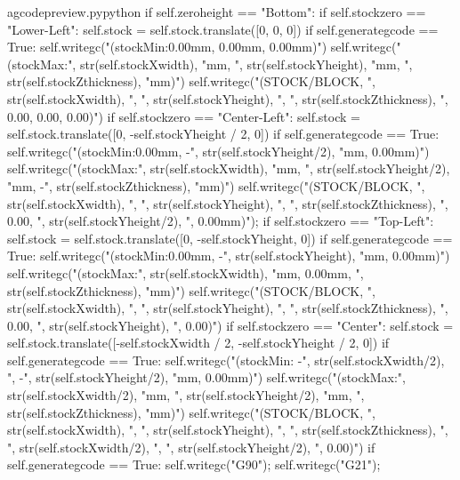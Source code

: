 \documentclass{ltxdoc}
\begin{document}
\begin{writecode}{a}{gcodepreview.py}{python}
        if self.zeroheight == "Bottom":
            if self.stockzero == "Lower-Left":
                 self.stock = self.stock.translate([0, 0, 0])
                 if self.generategcode == True:
                     self.writegc("(stockMin:0.00mm, 0.00mm, 0.00mm)")
                     self.writegc("(stockMax:", str(self.stockXwidth), "mm, ", str(self.stockYheight), "mm, ", str(self.stockZthickness), "mm)")
                     self.writegc("(STOCK/BLOCK, ", str(self.stockXwidth), ", ", str(self.stockYheight), ", ", str(self.stockZthickness), ", 0.00, 0.00, 0.00)")
            if self.stockzero == "Center-Left":
                self.stock = self.stock.translate([0, -self.stockYheight / 2, 0])
                if self.generategcode == True:
                    self.writegc("(stockMin:0.00mm, -", str(self.stockYheight/2), "mm, 0.00mm)")
                    self.writegc("(stockMax:", str(self.stockXwidth), "mm, ", str(self.stockYheight/2), "mm, -", str(self.stockZthickness), "mm)")
                    self.writegc("(STOCK/BLOCK, ", str(self.stockXwidth), ", ", str(self.stockYheight), ", ", str(self.stockZthickness), ", 0.00, ", str(self.stockYheight/2), ", 0.00mm)");
            if self.stockzero == "Top-Left":
                self.stock = self.stock.translate([0, -self.stockYheight, 0])
                if self.generategcode == True:
                    self.writegc("(stockMin:0.00mm, -", str(self.stockYheight), "mm, 0.00mm)")
                    self.writegc("(stockMax:", str(self.stockXwidth), "mm, 0.00mm, ", str(self.stockZthickness), "mm)")
                    self.writegc("(STOCK/BLOCK, ", str(self.stockXwidth), ", ", str(self.stockYheight), ", ", str(self.stockZthickness), ", 0.00, ", str(self.stockYheight), ", 0.00)")
            if self.stockzero == "Center":
                self.stock = self.stock.translate([-self.stockXwidth / 2, -self.stockYheight / 2, 0])
                if self.generategcode == True:
                    self.writegc("(stockMin: -", str(self.stockXwidth/2), ", -", str(self.stockYheight/2), "mm, 0.00mm)")
                    self.writegc("(stockMax:", str(self.stockXwidth/2), "mm, ", str(self.stockYheight/2), "mm, ", str(self.stockZthickness), "mm)")
                    self.writegc("(STOCK/BLOCK, ", str(self.stockXwidth), ", ", str(self.stockYheight), ", ", str(self.stockZthickness), ", ", str(self.stockXwidth/2), ", ", str(self.stockYheight/2), ", 0.00)")
        if self.generategcode == True:
            self.writegc("G90");
            self.writegc("G21");

\end{writecode}
\addtocounter{gcpy}{54}
\end{document}
